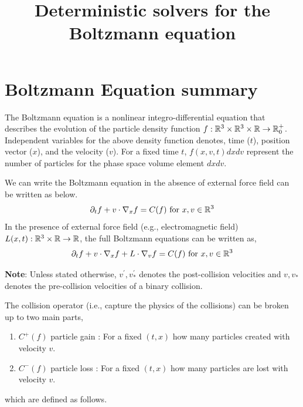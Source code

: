 \documentclass{article}[draft]
\title{Deterministic solvers for the Boltzmann equation}
\begin{document}
\maketitle

\tableofcontents
\clearpage
\section{Boltzmann Equation summary}
The Boltzmann equation is a nonlinear integro-differential equation that describes the evolution of the particle density function $f : \mathbb{R}^3 \times \mathbb{R}^3 \times \mathbb{R} \rightarrow \mathbb{R}^{+}_0$. Independent variables for the above density function denotes, time ($t$), position vector ($x$), and the velocity ($v$). For a fixed time $t$, $f(x,v,t)dx dv$ represent the number of particles for the phase space volume element $dxdv$. 

We can write the Boltzmann equation in the absence of external force field can be written as below. 
\begin{equation}
    \partial_t f + v\cdot \nabla_x f = C(f) \text{ for } x,v \in \mathbb{R}^3 \label{eq:be}
\end{equation}
In the presence of external force field (e.g., electromagnetic field) $L(x,t) : \mathbb{R}^3 \times \mathbb{R} \rightarrow \mathbb{R}$, the full Boltzmann equations can be written as, 
\begin{equation}
    \partial_t f + v\cdot \nabla_x f  + L \cdot \nabla_v f = C(f) \text{ for } x,v \in \mathbb{R}^3 \label{eq:be_full}
\end{equation}


\textbf{Note}: Unless stated otherwise, $v^\prime,v_*^\prime$ denotes the post-collision velocities and $v,v_*$ denotes the pre-collision velocities of a binary collision.

The collision operator (i.e., capture the physics of the collisions) can be broken up to two main parts, 
\begin{enumerate}
    \item $C^+(f)$ particle gain : For a fixed $(t,x)$ how many particles created with velocity $v$.
    \item $C^-(f)$ particle loss : For a fixed $(t,x)$ how many particles are lost with velocity $v$.
\end{enumerate} which are defined as follows. 
\end{document}

